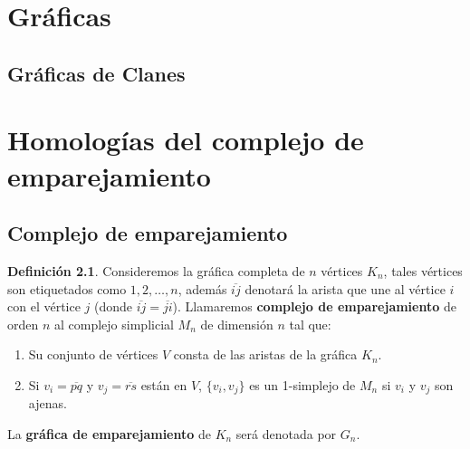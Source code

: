\documentclass[12pt]{book}
\theoremstyle{definition}
\newtheorem{definition}[theorem]{Definición}
\newcounter{in}
\newcounter{ini}
\begin{document}
\chapter{Gráficas}


\section{Gráficas de Clanes}

\chapter{Homologías del complejo de emparejamiento}
\section{Complejo de emparejamiento}

\begin{definition}
Consideremos la gráfica completa de $n$ vértices $K_{n}$, tales
vértices son etiquetados como $1,2,\ldots,n$, además
$\overline{ij}$ denotará la arista que une al vértice $i$ con el
vértice $j$ (donde $\overline{ij}=\overline{ji}$). Llamaremos \textbf{complejo de emparejamiento} de orden
$n$ al complejo simplicial $M_{n}$ de dimensión $n$ tal que:

\begin{enumerate}
  \item Su conjunto de vértices $V$ consta de las aristas de la gráfica
  $K_{n}$. 
  \item Si $v_{i}=\overline{pq}$ y $v_{j}=\overline{rs}$ están en
  $V$, $\{v_{i},v_{j}\}$ es  un 1-simplejo de $M_{n}$ si $v_{i}$
  y $v_{j}$ son ajenas.
\end{enumerate} 
La \textbf{gráfica de emparejamiento} de $K_{n}$ será denotada por $G_{n}$.
\end{definition}
\end{document}
